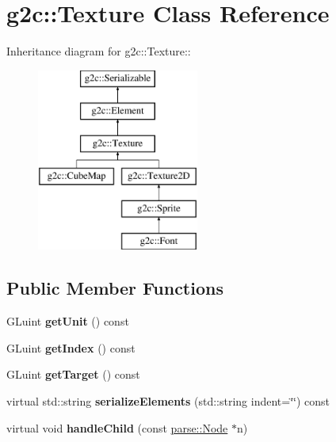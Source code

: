 \hypertarget{classg2c_1_1_texture}{
\section{g2c::Texture Class Reference}
\label{classg2c_1_1_texture}
}
Inheritance diagram for g2c::Texture::\begin{figure}[H]
\begin{center}
\leavevmode
\includegraphics[height=6cm]{classg2c_1_1_texture}
\end{center}
\end{figure}
\subsection*{Public Member Functions}
\begin{DoxyCompactItemize}
\item 
\hypertarget{classg2c_1_1_texture_adc2d0f45ef1e489e04abd84ddd7c8439}{
GLuint {\bfseries getUnit} () const }
\label{classg2c_1_1_texture_adc2d0f45ef1e489e04abd84ddd7c8439}

\item 
\hypertarget{classg2c_1_1_texture_a63c9b6f6119976d505cc0a0750256460}{
GLuint {\bfseries getIndex} () const }
\label{classg2c_1_1_texture_a63c9b6f6119976d505cc0a0750256460}

\item 
\hypertarget{classg2c_1_1_texture_ab9caf8729da624fa63df9959fc0e06f0}{
GLuint {\bfseries getTarget} () const }
\label{classg2c_1_1_texture_ab9caf8729da624fa63df9959fc0e06f0}

\item 
\hypertarget{classg2c_1_1_texture_a53cddf5c787468975e52730f33e777e1}{
virtual std::string {\bfseries serializeElements} (std::string indent=\char`\"{}\char`\"{}) const }
\label{classg2c_1_1_texture_a53cddf5c787468975e52730f33e777e1}

\item 
\hypertarget{classg2c_1_1_texture_a8e9fe06fa6fbf8b55989cc0ea447e938}{
virtual void {\bfseries handleChild} (const \hyperlink{classparse_1_1_node}{parse::Node} $\ast$n)}
\label{classg2c_1_1_texture_a8e9fe06fa6fbf8b55989cc0ea447e938}

\end{DoxyCompactItemize}
